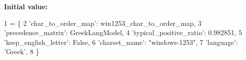 {\bfseries Initial value\+:}
\begin{DoxyCode}
1 =  \{
2   \textcolor{stringliteral}{'char\_to\_order\_map'}: win1253\_char\_to\_order\_map,
3   \textcolor{stringliteral}{'precedence\_matrix'}: GreekLangModel,
4   \textcolor{stringliteral}{'typical\_positive\_ratio'}: 0.982851,
5   \textcolor{stringliteral}{'keep\_english\_letter'}: \textcolor{keyword}{False},
6   \textcolor{stringliteral}{'charset\_name'}: \textcolor{stringliteral}{"windows-1253"},
7   \textcolor{stringliteral}{'language'}: \textcolor{stringliteral}{'Greek'},
8 \}
\end{DoxyCode}
